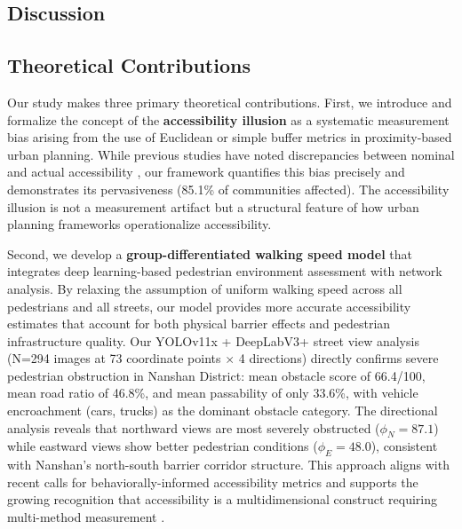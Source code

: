 \documentclass[10pt,conference,compsoc]{IEEEtran}
\begin{document}
\begin{table}[htbp]
\begin{center}
\section{Discussion}
\label{sec:discussion}

\subsection{Theoretical Contributions}

Our study makes three primary theoretical contributions. First, we introduce and formalize the concept of the \textbf{accessibility illusion} as a systematic measurement bias arising from the use of Euclidean or simple buffer metrics in proximity-based urban planning. While previous studies have noted discrepancies between nominal and actual accessibility \cite{bruno2024universal,recurrent2025}, our framework quantifies this bias precisely and demonstrates its pervasiveness (85.1\% of communities affected). The accessibility illusion is not a measurement artifact but a structural feature of how urban planning frameworks operationalize accessibility.

Second, we develop a \textbf{group-differentiated walking speed model} that integrates deep learning-based pedestrian environment assessment with network analysis. By relaxing the assumption of uniform walking speed across all pedestrians and all streets, our model provides more accurate accessibility estimates that account for both physical barrier effects and pedestrian infrastructure quality. Our YOLOv11x + DeepLabV3+ street view analysis (N=294 images at 73 coordinate points $\times$ 4 directions) directly confirms severe pedestrian obstruction in Nanshan District: mean obstacle score of 66.4/100, mean road ratio of 46.8\%, and mean passability of only 33.6\%, with vehicle encroachment (cars, trucks) as the dominant obstacle category. The directional analysis reveals that northward views are most severely obstructed ($\phi_N=87.1$) while eastward views show better pedestrian conditions ($\phi_E=48.0$), consistent with Nanshan's north-south barrier corridor structure. This approach aligns with recent calls for behaviorally-informed accessibility metrics \cite{recurrent2025} and supports the growing recognition that accessibility is a multidimensional construct requiring multi-method measurement \cite{geurs2004accessibility}.


\end{center}
\end{table}
\end{document}
